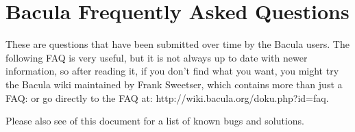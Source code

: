 
\chapter{Bacula Frequently Asked Questions}
\label{FaqChapter}

These are questions that have been submitted over time by the
Bacula users. The following
FAQ is very useful, but it is not always up to date
with newer information, so after reading it, if you don't find what you
want, you might try the Bacula wiki maintained by Frank Sweetser, which
contains more than just a FAQ:
or go directly to the FAQ at:
{http://wiki.bacula.org/doku.php?id=faq}.

Please also see
 of this document for a list
of known bugs and solutions.


